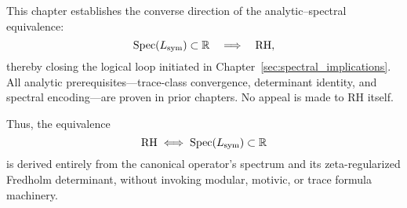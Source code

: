 \begin{remark}
\label{rem:structural_role_of_ch8}

This chapter establishes the converse direction of the analytic–spectral equivalence:
\[
\operatorname{Spec}(L_{\mathrm{sym}}) \subset \mathbb{R} \quad \Longrightarrow \quad \mathrm{RH},
\]
thereby closing the logical loop initiated in Chapter~\ref{sec:spectral_implications}. All analytic prerequisites—trace-class convergence, determinant identity, and spectral encoding—are proven in prior chapters. No appeal is made to RH itself.

Thus, the equivalence
\[
\mathrm{RH} \iff \operatorname{Spec}(L_{\mathrm{sym}}) \subset \mathbb{R}
\]
is derived entirely from the canonical operator's spectrum and its zeta-regularized Fredholm determinant, without invoking modular, motivic, or trace formula machinery.
\end{remark}
